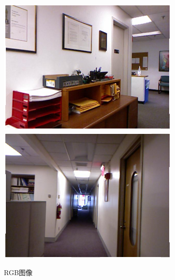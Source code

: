 \begin{figure}[htb]
\begin{subfigure}{0.24\linewidth}
\begin{minipage}[b]{1\linewidth}
    \includegraphics[width=1\linewidth]{figure/Without_FAM/8.png}\vspace{4pt}
    \includegraphics[width=1\linewidth]{figure/Without_FAM/14.png}
    \end{minipage}
    \caption{RGB图像}
  \end{subfigure}
  \begin{subfigure}{0.24\linewidth}
    \begin{minipage}[b]{1\linewidth}

\end{minipage}
\end{subfigure}
\end{figure}
